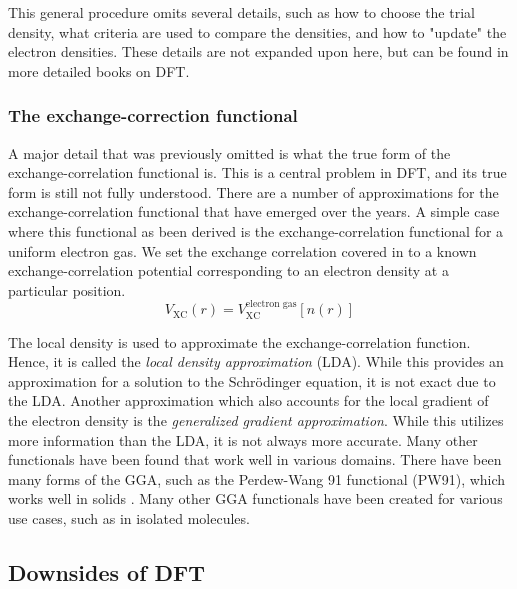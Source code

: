 \noindent This general procedure omits several details, such as how
to choose the
trial density, what criteria are used to compare the densities, and
how to "update"
the electron densities. These details are not expanded upon here, but
can be found
in more detailed books on DFT.

\subsubsection{The exchange-correction functional}
\label{sec:Exc}

A major detail that was previously omitted is what the true form of the
exchange-correlation functional is. This is a central problem in DFT,
and its true form is  still not fully understood. There are a number of
approximations for the exchange-correlation functional that have
emerged over the years. A simple case where this functional as been derived
is the exchange-correlation functional for a uniform electron gas.
We set the exchange correlation covered
in  to a known exchange-correlation potential corresponding to
an electron density at a particular position.
\begin{equation}
V_{\text{XC}}(r) = V_{\text{XC}}^{\text{electron gas}}[n(r)]
\end{equation}

The local density is used to
approximate the exchange-correlation function. Hence, it is called the
\textit{local density approximation} (LDA). While this provides an approximation
for a solution to the Schr\"odinger equation, it is not exact due to the
LDA. Another approximation which also accounts for the local gradient of the
electron density is the \textit{generalized gradient approximation}. While this
utilizes more information than the LDA, it is not always more accurate. Many
other functionals have been found that work well in various domains. There have
been many forms of the GGA, such as the Perdew-Wang 91 functional (PW91), which
works well in solids \cite{perdew-wang}. Many other GGA functionals have been
created for various use cases, such as in isolated molecules.

\subsection{Downsides of DFT}

